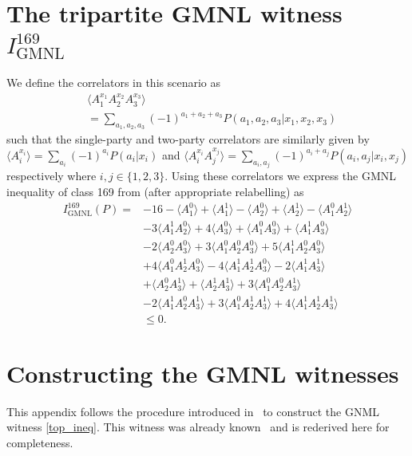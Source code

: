 \documentclass[pra,aps,reprint,superscriptaddress]{revtex4-2}
\theoremstyle{theorem}
\begin{document}
\appendix

\section{The tripartite GMNL witness $I^{169}_{\text{GMNL}}$}\label{app:explicit_ineq}
We define the correlators in this scenario as
\begin{align}\nonumber
    &\langle A_1^{x_1}A_2^{x_2}A_3^{x_3}\rangle \\&= \sum_{a_1,a_2,a_3}(-1)^{a_1+a_2+a_3}P(a_1,a_2,a_3|x_1,x_2,x_3)
\end{align}
such that the single-party and two-party correlators are similarly given by $\langle A_i^{x_i}\rangle = \sum_{a_i}(-1)^{a_i}P(a_i|x_i)$ and $\langle A_i^{x_i}A_j^{x_j}\rangle = \sum_{a_i,a_j}(-1)^{a_i + a_j}P(a_i,a_j|x_i,x_j)$ respectively where $i,j\in\{1,2,3\}$. Using these correlators we express the GMNL inequality of class 169 from \cite{Bancal2013} (after appropriate relabelling) as
\begin{align}\nonumber
  I^{169}_{\text{GMNL}}(P)=& -16 -   \langle A_1^{0}\rangle + \langle A_1^{1}\rangle -\langle A_2^{0}\rangle + \langle A_2^{1}\rangle - \langle A_1^{0}A_2^{1}\rangle\\\nonumber& - 3\langle A_1^{1}A_2^{0}\rangle +4\langle A_3^{0}\rangle + \langle A_1^{0}A_3^{0}\rangle + \langle A_1^{1}A_3^{0}\rangle\\\nonumber&-2\langle A_2^{0}A_3^{0}\rangle + 3\langle A_1^{0}A_2^{0}A_3^{0}\rangle + 5\langle A_1^{1}A_2^{0}A_3^{0}\rangle\\\nonumber&
  +4\langle A_1^{0}A_2^{1}A_3^{0}\rangle -4\langle A_1^{1}A_2^{1}A_3^{0}\rangle-2\langle A_1^{1}A_3^{1}\rangle\\\nonumber& +\langle A_2^{0}A_3^{1}\rangle+\langle A_2^{1}A_3^{1}\rangle + 3\langle A_1^{0}A_2^{0}A_3^{1}\rangle\\\nonumber & -2\langle A_1^{1}A_2^{0}A_3^{1}\rangle+3\langle A_1^{0}A_2^{1}A_3^{1}\rangle+4\langle A_1^{1}A_2^{1}A_3^{1}\rangle\\&\leq0.
\end{align}

\section{Constructing the GMNL witnesses}
\label{app:lifting}
This appendix follows the procedure introduced in~\cite{Curchod_2019} to construct the GNML witness \eqref{top_ineq}. This witness was already known~\cite{Contreras_Tejada_2021} and is rederived here for completeness.
\end{document}
